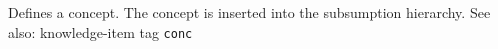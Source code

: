   

Defines a concept. The concept is inserted into the subsumption hierarchy.
See also: knowledge-item tag {\tt conc}



